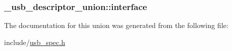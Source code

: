 \hypertarget{union__usb__descriptor__union_a47f00994f688807bc39aec487aac63db}{
\subsubsection[{interface}]{ \-\_\-usb\-\_\-descriptor\-\_\-union\-::interface}}\label{union__usb__descriptor__union_a47f00994f688807bc39aec487aac63db}


The documentation for this union was generated from the following file\-:\begin{DoxyCompactItemize}
\item 
include/\hyperlink{usb__spec_8h}{usb\-\_\-spec.\-h}\end{DoxyCompactItemize}
